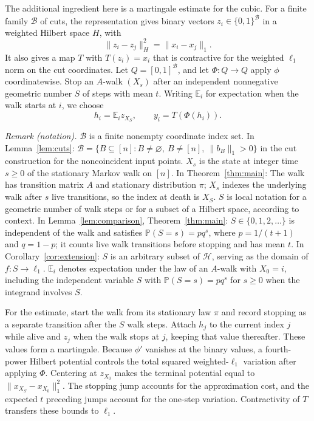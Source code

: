 \documentclass[11pt]{article}
\theoremstyle{definition}
\theoremstyle{remark}
\numberwithin{equation}{section}
\newcommand{\E}{\mathbb E}
\newcommand{\Prob}{\mathbb P}
\begin{document}
The additional ingredient here is a martingale estimate for the
cubic. For a finite family $\mathcal B$ of cuts, the representation
gives binary vectors $z_i\in\{0,1\}^{\mathcal B}$ in a weighted
Hilbert space $H$, with
\[
 \|z_i-z_j\|_H^2=\|x_i-x_j\|_1.
\]
It also gives a map $T$ with $T(z_i)=x_i$ that is contractive for
the weighted $\ell_1$ norm on the cut coordinates. Let
$Q=[0,1]^{\mathcal B}$, and let $\Phi:Q\to Q$ apply $\phi$
coordinatewise. Stop an $A$-walk $(X_s)$ after an independent
nonnegative geometric number $S$ of steps with mean $t$. Writing $\E_i$ for
expectation when the walk starts at $i$, we choose
\[
 h_i=\E_i z_{X_S},\qquad y_i=T(\Phi(h_i)).
\]

\noindent\textit{Remark (notation).} $\mathcal B$ is a finite nonempty coordinate index set. In Lemma~\ref{lem:cuts}: $\mathcal B=\{B\subseteq[n]:B\ne\varnothing,\ B\ne[n],\ \|b_B\|_1>0\}$ in the cut construction for the noncoincident input points. $X_s$ is the state at integer time $s\geq0$ of the stationary Markov walk on $[n]$. In Theorem~\ref{thm:main}: The walk has transition matrix $A$ and stationary distribution $\pi$; $X_s$ indexes the underlying walk after $s$ live transitions, so the index at death is $X_S$. $S$ is local notation for a geometric number of walk steps or for a subset of a Hilbert space, according to context. In Lemma~\ref{lem:comparison}, Theorem~\ref{thm:main}: $S\in\{0,1,2,\ldots\}$ is independent of the walk and satisfies $\Prob(S=s)=pq^s$, where $p=1/(t+1)$ and $q=1-p$; it counts live walk transitions before stopping and has mean $t$. In Corollary~\ref{cor:extension}: $S$ is an arbitrary subset of $\mathcal H$, serving as the domain of $f:S\to\ell_1$. $\E_i$ denotes expectation under the law of an $A$-walk with $X_0=i$, including the independent variable $S$ with $\Prob(S=s)=pq^s$ for $s\geq0$ when the integrand involves $S$.


For the estimate, start the walk from its stationary law $\pi$
and record stopping as a separate transition after the $S$ walk
steps. Attach $h_j$ to the current index $j$ while alive and
$z_j$ when the walk stops at $j$, keeping that value thereafter.
These values form a martingale. Because $\phi'$ vanishes at the
binary values, a fourth-power Hilbert potential controls the
total squared weighted-$\ell_1$ variation after applying $\Phi$.
Centering at $z_{X_0}$ makes the terminal potential equal to
$\|x_{X_S}-x_{X_0}\|_1^2$. The stopping jump accounts for the
approximation cost, and the expected $t$ preceding jumps account
for the one-step variation. Contractivity of $T$ transfers these
bounds to $\ell_1$.
\end{document}
